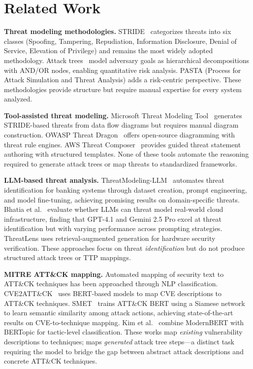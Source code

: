 \section{Related Work}

\textbf{Threat modeling methodologies.}
STRIDE~\cite{shostack2014threat} categorizes threats into six classes (Spoofing, Tampering, Repudiation, Information Disclosure, Denial of Service, Elevation of Privilege) and remains the most widely adopted methodology. Attack trees~\cite{schneier1999attack} model adversary goals as hierarchical decompositions with AND/OR nodes, enabling quantitative risk analysis. PASTA (Process for Attack Simulation and Threat Analysis) adds a risk-centric perspective. These methodologies provide structure but require manual expertise for every system analyzed.

\textbf{Tool-assisted threat modeling.}
Microsoft Threat Modeling Tool~\cite{microsoft-tmt} generates STRIDE-based threats from data flow diagrams but requires manual diagram construction. OWASP Threat Dragon~\cite{owasp-threatdragon} offers open-source diagramming with threat rule engines. AWS Threat Composer~\cite{aws-threatcomposer} provides guided threat statement authoring with structured templates. None of these tools automate the reasoning required to generate attack trees or map threats to standardized frameworks.

\textbf{LLM-based threat analysis.}
ThreatModeling-LLM~\cite{threatmodeling-llm2024} automates threat identification for banking systems through dataset creation, prompt engineering, and model fine-tuning, achieving promising results on domain-specific threats. Bhatia et al.~\cite{canllmsthreatmodel2025} evaluate whether LLMs can threat model real-world cloud infrastructure, finding that GPT-4.1 and Gemini 2.5 Pro excel at threat identification but with varying performance across prompting strategies. ThreatLens uses retrieval-augmented generation for hardware security verification. These approaches focus on threat \emph{identification} but do not produce structured attack trees or TTP mappings.

\textbf{MITRE ATT\&CK mapping.}
Automated mapping of security text to ATT\&CK techniques has been approached through NLP classification. CVE2ATT\&CK~\cite{cve2attack2022} uses BERT-based models to map CVE descriptions to ATT\&CK techniques. SMET~\cite{smet2023} trains ATT\&CK BERT using a Siamese network to learn semantic similarity among attack actions, achieving state-of-the-art results on CVE-to-technique mapping. Kim et al.~\cite{modernbert2025} combine ModernBERT with BERTopic for tactic-level classification. These works map \emph{existing} vulnerability descriptions to techniques; \threatforest{} maps \emph{generated} attack tree steps---a distinct task requiring the model to bridge the gap between abstract attack descriptions and concrete ATT\&CK techniques.

